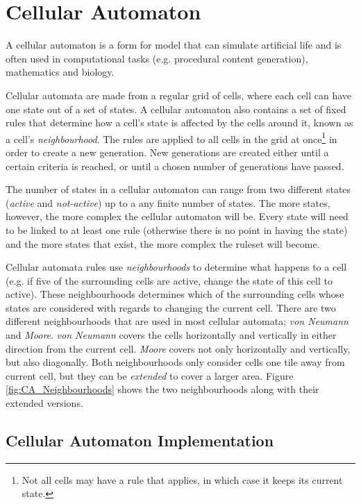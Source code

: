 \section{Cellular Automaton}
\label{methodology_ca}
A cellular automaton is a form for model that can simulate artificial life and is often used in computational tasks (e.g. procedural content generation\cite{togelius2011search}), mathematics and biology. 

Cellular automata are made from a regular grid of cells, where each cell can have one state out of a set of states. A cellular automaton also contains a set of fixed rules that determine how a cell's state is affected by the cells around it, known as a cell's \textit{neighbourhood}. The rules are applied to all cells in the grid at once\footnote{Not all cells may have a rule that applies, in which case it keeps its current state.} in order to create a new generation. New generations are created either until a certain criteria is reached, or until a chosen number of generations have passed.

The number of states in a cellular automaton can range from two different states (\textit{active} and \textit{not-active}) up to a any finite number of states. The more states, however, the more complex the cellular automaton will be. Every state will need to be linked to at least one rule (otherwise there is no point in having the state) and the more states that exist, the more complex the ruleset will become.

Cellular automata rules use \textit{neighbourhoods} to determine what happens to a cell (e.g. if five of the surrounding cells are active, change the state of this cell to active). These neighbourhoods determines which of the surrounding cells whose states are considered with regards to changing the current cell. There are two different neighbourhoods that are used in most cellular automata; \textit{von Neumann} and \textit{Moore}. \textit{von Neumann} covers the cells horizontally and vertically in either direction from the current cell. \textit{Moore} covers not only horizontally and vertically, but also diagonally. Both neighbourhoods only consider cells one tile away from current cell, but they can be \textit{extended} to cover a larger area. Figure \ref{fig:CA_Neighbourhoods} shows the two neighbourhoods along with their extended versions.


\subsection{Cellular Automaton Implementation}
\label{methodology_ca_our}

